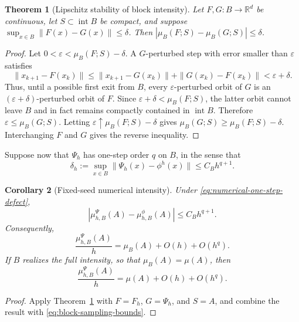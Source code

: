 \documentclass[pdflatex,sn-mathphys-num]{sn-jnl}
\numberwithin{equation}{section}
\theoremstyle{thmstyleone}%
\newtheorem{theorem}{Theorem}[section]
\newtheorem{corollary}[theorem]{Corollary}
\theoremstyle{definition}
\theoremstyle{remark}
\begin{document}
\begin{theorem}[Lipschitz stability of block intensity]
\label{thm:block-intensity-map-stability}
Let $F,G:B\to\mathbb R^d$ be continuous, let $S\subset\operatorname{int}B$ be compact, and suppose $\sup_{x\in B}\|F(x)-G(x)\| \leq\delta$. Then
    $\left|
    \mu_B(F;S)-\mu_B(G;S)
    \right|
    \leq\delta$.
\end{theorem}

\begin{proof}
Let $0<\varepsilon<\mu_B(F;S)-\delta$. A $G$-perturbed step with error smaller than $\varepsilon$ satisfies
\[
    \|x_{k+1}-F(x_k)\|\leq
    \|x_{k+1}-G(x_k)\|
    +
    \|G(x_k)-F(x_k)\|<
    \varepsilon+\delta.
\]
Thus, until a possible first exit from $B$, every $\varepsilon$-perturbed orbit of $G$ is an $(\varepsilon+\delta)$-perturbed orbit of $F$. Since $\varepsilon+\delta<\mu_B(F;S)$, the latter orbit cannot leave $B$ and in fact remains compactly contained in $\operatorname{int}B$. Therefore $\varepsilon\leq\mu_B(G;S)$. Letting $\varepsilon\uparrow\mu_B(F;S)-\delta$ gives $\mu_B(G;S) \geq \mu_B(F;S)-\delta$. Interchanging $F$ and $G$ gives the reverse inequality.
\end{proof}

Suppose now that $\Psi_h$ has one-step order $q$ on $B$, in the sense that
\begin{equation}
\label{eq:numerical-one-step-defect}
    \delta_h
    :=
    \sup_{x\in B}
    \|\Psi_h(x)-\phi^h(x)\|
    \leq C_Bh^{q+1}.
\end{equation}

\begin{corollary}[Fixed-seed numerical intensity]
\label{cor:fixed-seed-numerical-intensity}
Under \eqref{eq:numerical-one-step-defect},
\begin{equation}
\label{eq:fixed-seed-intensity-error}
    \left|
    \mu_{h,B}^{\Psi}(A)
    -
    \mu_{h,B}^{\phi}(A)
    \right|
    \leq
    C_Bh^{q+1}.
\end{equation}
Consequently,
\[
    \frac{\mu_{h,B}^{\Psi}(A)}{h}
    =
    \mu_B(A)+O(h)+O(h^q).
\]
If $B$ realizes the full intensity, so that $\mu_B(A)=\mu(A)$, then
\[
    \frac{\mu_{h,B}^{\Psi}(A)}{h}
    =
    \mu(A)+O(h)+O(h^q).
\]
\end{corollary}

\begin{proof}
Apply Theorem~\ref{thm:block-intensity-map-stability} with $F=F_h$, $G=\Psi_h$, and $S=A$, and combine the result with \eqref{eq:block-sampling-bounds}.
\end{proof}
\end{document}
